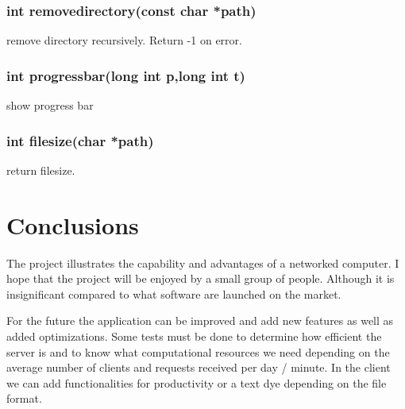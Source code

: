 \documentclass[runningheads]{llncs}
\begin{document}
        \subsubsection{int remove\textunderscore directory(const char *path)}
            remove directory recursively. Return -1 on error.
        \subsubsection{int progressbar(long int p,long int t)}
            show progress bar
        \subsubsection{int filesize(char *path)}
            return filesize.
        


\section{Conclusions}
    The project illustrates the capability and advantages of a networked computer. I hope that the project will be enjoyed by a small group of people. Although it is insignificant compared to what software are launched on the market.

    For the future the application can be improved and add new features as well as added optimizations. Some tests must be done to determine how efficient the server is and to know what computational resources we need depending on the average number of clients and requests received per day / minute. In the client we can add functionalities for productivity or a text dye depending on the file format.
    \nocite{*}



\end{document}

